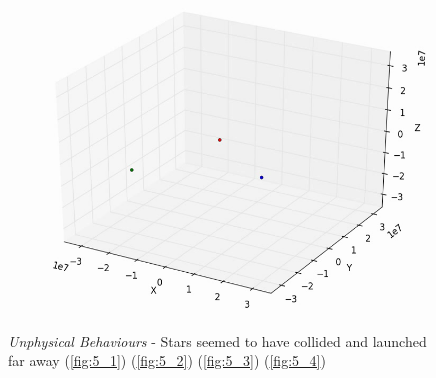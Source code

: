 \documentclass[10pt,letterpaper]{article}
\begin{document}
\begin{figure}[!htb]
  \subcaption{}\label{fig:5_3}
\endminipage
{}
  \includegraphics[width=\linewidth]{figures/three_body/5_4.png}
  \subcaption{}\label{fig:5_4}
\endminipage
\caption{ \textit{Unphysical Behaviours} - Stars seemed to have collided and launched far away
(\ref{fig:5_1}) 
(\ref{fig:5_2}) 
(\ref{fig:5_3}) 
(\ref{fig:5_4})}\label{fig:5}
\end{figure}
\end{document}
